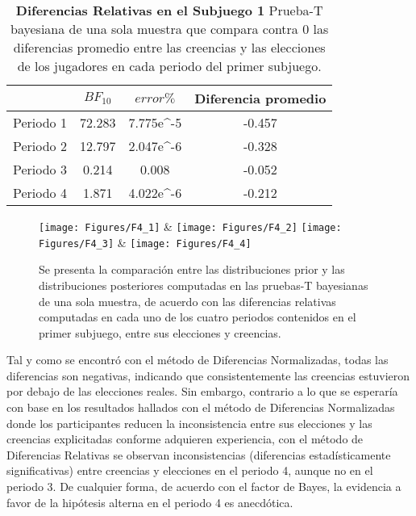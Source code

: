 \begin{table}[h]
\caption[Prueba t de una muestra: Diferencias Relativas en el Subjuego 1]{\textbf{Diferencias Relativas en el Subjuego 1} Prueba-T bayesiana de una sola muestra que compara contra 0 las diferencias promedio entre las creencias y las elecciones de los jugadores en cada periodo del primer subjuego.}
\label{DR-S1-B}
\centering
\begin{tabular}{l | c c | c}
\toprule
\textbf{} & \textbf{$BF_{10}$} & \textbf{$error\%$} & \textbf{Diferencia promedio}\\
\midrule
Periodo 1 & 72.283 & 7.775e^-5 & -0.457\\
Periodo 2 & 12.797 & 2.047e^-6 & -0.328\\
Periodo 3 & 0.214 & 0.008 & -0.052\\
Periodo 4 & 1.871 & 4.022e^-6 & -0.212\\
\bottomrule
\end{tabular}
\end{table}
	


\begin{figure}[hp]
\centering
\texttt{[image: Figures/F4\_1]} & \texttt{[image: Figures/F4\_2]} 
\texttt{[image: Figures/F4\_3]} & \texttt{[image: Figures/F4\_4]} 
\decoRule
\caption[Evaluación de las Diferencias Normalizadas entre creencias y elecciones en el Subjuegoo 1 (Factor de Bayes)]{Se presenta la comparación entre las distribuciones prior y las distribuciones posteriores computadas en las pruebas-T bayesianas de una sola muestra, de acuerdo con las diferencias relativas computadas en cada uno de los cuatro periodos contenidos en el primer subjuego, entre sus elecciones y creencias.}
\label{fig:DR_S1}
\end{figure}

Tal y como se encontró con el método de Diferencias Normalizadas, todas las diferencias son negativas, indicando que consistentemente las creencias estuvieron por debajo de las elecciones reales. Sin embargo, contrario a lo que se esperaría con base en los resultados hallados con el método de Diferencias Normalizadas donde los participantes reducen la inconsistencia entre sus elecciones y las creencias explicitadas conforme adquieren experiencia, con el método de Diferencias Relativas se observan inconsistencias (diferencias estadísticamente significativas) entre creencias y elecciones en el periodo 4, aunque no en el periodo 3. De cualquier forma, de acuerdo con el factor de Bayes, la evidencia a favor de la hipótesis alterna en el periodo 4 es anecdótica.\\

